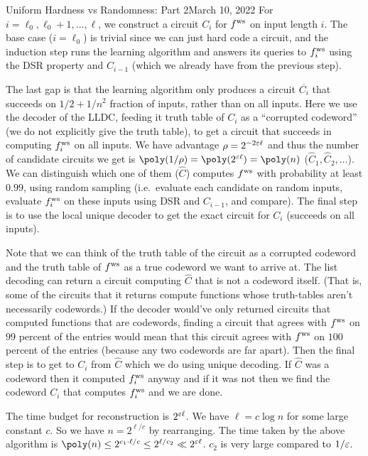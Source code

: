 \begin{lecture}{8}{Uniform Hardness vs Randomness: Part 2}{March 10, 2022}
For $i=\ell_0,\ell_0+1,\ldots,\ell$, we construct a circuit $C_i$ for $ f^{\text{ws}} $ on input length $i$. The base case ($i=\ell_0$) is trivial since we can just hard code a circuit, and the induction step runs the learning algorithm and answers its queries to $ f^{\text{ws}} _i$ using the DSR property and $C_{i-1}$ (which we already have from the previous step). 

The last gap is that the learning algorithm only produces a circuit $\overline{C_i}$ that succeeds on $1/2+1/n^2$ fraction of inputs, rather than on all inputs. Here we use the decoder of the LLDC, feeding it truth table of $C_i$ as a ``corrupted codeword'' (we do not explicitly give the truth table), to get a circuit that succeeds in computing $ f^{\text{ws}} _i$ on all inputs. We have advantage $\rho = 2^{-2\varepsilon \ell}$ and thus the number of candidate circuits we get is $\poly(1/\rho) = \poly(2^{\eps \ell}) = \poly(n)$ ($\hat{C}_1,\hat{C}_2,\ldots$).
We can distinguish which one of them ($\hat{C}$) computes $ f^{\text{ws}} $ with probability at least $0.99$, using random sampling (i.e.\, evaluate each candidate on random inputs, evaluate $ f^{\text{ws}} _i$ on these inputs using DSR and $C_{i-1}$, and compare). The final step is to use the local unique decoder to get the exact circuit for $C_i$ (succeeds on all inputs). 

Note that we can think of the truth table of the circuit as a corrupted codeword and the truth table of $ f^{\text{ws}} $ as a true codeword we want to arrive at. The list decoding can return a circuit computing $\hat{C}$ that is not a codeword itself. (That is, some of the circuits that it returns compute functions whose truth-tables aren't necessarily codewords.) If the decoder would've only returned circuits that computed functions that are codewords, finding a circuit that agrees with $ f^{\text{ws}} $ on $99$ percent of the entries would mean that this circuit agrees with $ f^{\text{ws}} $ on $100$ percent of the entries (because any two codewords are far apart). 
Then the final step is to get to $C_i$ from $\hat{C}$ which we do using unique decoding. If $\hat{C}$ was a codeword then it computed $ f^{\text{ws}} _i$ anyway and if it was not then we find the codeword $C_i$ that computes $ f^{\text{ws}} _i$ and we are done.

The time budget for reconstruction is $2^{\varepsilon \ell}$. We have $\ell=c \log n$ for some large constant $c$. So we have $n= 2^{\ell/c}$ by rearranging. The time taken by the above algorithm is $\poly(n) \leq 2^{c_1 \cdot \ell/c} \leq 2^{\ell/c_2} \ll 2^{\eps \ell}$. $c_2$ is very large compared to $1/\varepsilon$. 


\end{lecture}
